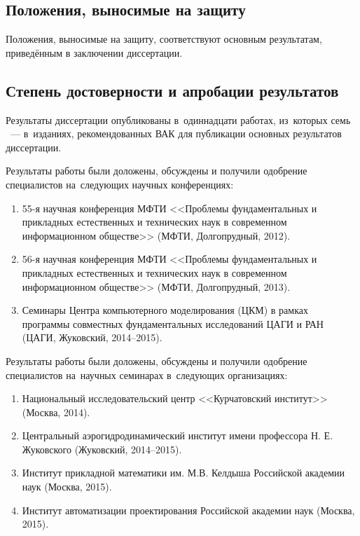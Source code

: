 \documentclass[thesis.tex]{subfiles}
\begin{document}
\subsection*{Положения, выносимые на защиту}
Положения, выносимые на защиту, соответствуют основным результатам, приведённым в заключении диссертации.

\subsection*{Степень достоверности и апробации результатов}

Результаты диссертации опубликованы в~одиннадцати \cite{беклемышева2013численное,васюков2014комбинирование,петров2014схм,petrov2014combined,петров2014численный,петров2015комбинированный,беклемышева2014численное,беклемышева2012численное,ермаков2013построение,беклемышева2013численное2,беклемышева2013численное3}
работах, из~которых семь \cite{беклемышева2013численное,васюков2014комбинирование,петров2014схм,petrov2014combined,петров2014численный,петров2015комбинированный,беклемышева2014численное}~---
в~изданиях, рекомендованных ВАК для публикации основных результатов диссертации.

Результаты работы были доложены, обсуждены и получили одобрение специалистов на~следующих научных конференциях:

\begin{enumerate}
    \item 55-я научная конференция МФТИ <<Проблемы фундаментальных и прикладных естественных и технических наук в
          современном информационном обществе>> (МФТИ, Долгопрудный, 2012).
    \item 56-я научная конференция МФТИ <<Проблемы фундаментальных и прикладных естественных и технических наук в
          современном информационном обществе>> (МФТИ, Долгопрудный, 2013).
    \item Семинары Центра компьютерного моделирования (ЦКМ) в рамках программы совместных фундаментальных исследований
          ЦАГИ и РАН (ЦАГИ, Жуковский, 2014--2015).
\end{enumerate}

Результаты работы были доложены, обсуждены и получили одобрение специалистов на~научных семинарах в~следующих
организациях:

\begin{enumerate}
    \item Национальный исследовательский центр <<Курчатовский институт>> (Москва, 2014).
    \item Центральный аэрогидродинамический институт имени профессора
          Н. Е. Жуковского (Жуковский, 2014--2015).
    \item Институт прикладной математики им. М.В. Келдыша Российской академии наук (Москва, 2015).
    \item Институт автоматизации проектирования Российской академии наук (Москва, 2015).
\end{enumerate}
\end{document}
